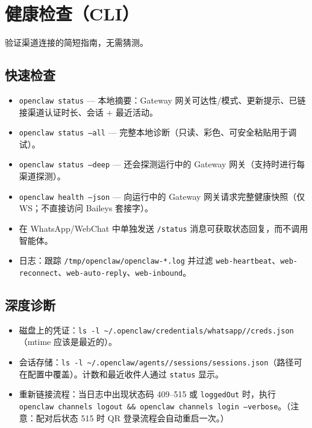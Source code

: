 \clearpage

\section{健康检查（CLI）}


验证渠道连接的简短指南，无需猜测。

\subsection{快速检查}


\begin{itemize}
  \item \texttt{openclaw status} — 本地摘要：Gateway 网关可达性/模式、更新提示、已链接渠道认证时长、会话 + 最近活动。
  \item \texttt{openclaw status --all} — 完整本地诊断（只读、彩色、可安全粘贴用于调试）。
  \item \texttt{openclaw status --deep} — 还会探测运行中的 Gateway 网关（支持时进行每渠道探测）。
  \item \texttt{openclaw health --json} — 向运行中的 Gateway 网关请求完整健康快照（仅 WS；不直接访问 Baileys 套接字）。
  \item 在 WhatsApp/WebChat 中单独发送 \texttt{/status} 消息可获取状态回复，而不调用智能体。
  \item 日志：跟踪 \texttt{/tmp/openclaw/openclaw-*.log} 并过滤 \texttt{web-heartbeat}、\texttt{web-reconnect}、\texttt{web-auto-reply}、\texttt{web-inbound}。
\end{itemize}


\subsection{深度诊断}


\begin{itemize}
  \item 磁盘上的凭证：\texttt{ls -l \textasciitilde{}/.openclaw/credentials/whatsapp//creds.json}（mtime 应该是最近的）。
  \item 会话存储：\texttt{ls -l \textasciitilde{}/.openclaw/agents//sessions/sessions.json}（路径可在配置中覆盖）。计数和最近收件人通过 \texttt{status} 显示。
  \item 重新链接流程：当日志中出现状态码 409–515 或 \texttt{loggedOut} 时，执行 \texttt{openclaw channels logout \&\& openclaw channels login --verbose}。（注意：配对后状态 515 时 QR 登录流程会自动重启一次。）
\end{itemize}


